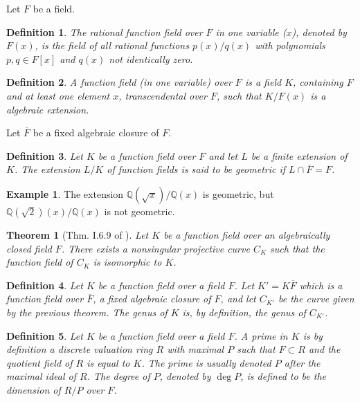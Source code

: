 \documentclass[12pt]{article}
\newtheorem{thm}{Theorem}
\newtheorem{defn}{Definition}
\theoremstyle{definition}
\newtheorem{exa}{Example}
\newcommand{\Rats}{\mathbb{Q}}
\begin{document}
Let $F$ be a field.

\begin{defn}
The rational function field over $F$ in one variable ($x$), denoted by $F(x)$, is the field of all rational functions $p(x)/q(x)$ with polynomials $p,q\in F[x]$ and $q(x)$ not identically zero.
\end{defn}

\begin{defn}
A function field (in one variable) over $F$ is a field $K$, containing $F$ and at least one element $x$, transcendental over $F$, such that $K/F(x)$ is a  algebraic extension.
\end{defn}

Let $\overline{F}$ be a fixed algebraic closure of $F$.

\begin{defn}
Let $K$ be a function field over $F$ and let $L$ be a finite extension of $K$. The extension $L/K$ of function fields is said to be geometric if $L\cap \overline{F}=F$.
\end{defn}

\begin{exa}
The extension $\Rats(\sqrt{x})/\Rats(x)$ is geometric, but $\Rats(\sqrt{2})(x)/\Rats(x)$ is not geometric.
\end{exa}

\begin{thm}[Thm. I.6.9 of \cite{hart}] Let $K$ be a function field over an algebraically closed field $F$. There exists a nonsingular projective curve $C_K$ such that the function field of $C_K$ is isomorphic to $K$.
\end{thm}

\begin{defn}
Let $K$ be a function field over a field $F$. Let $K'=K\overline{F}$ which is a function field over $\overline{F}$, a fixed algebraic closure of $F$, and let $C_{K'}$ be the curve given by the previous theorem. The genus of $K$ is, by definition, the genus of $C_{K'}$.
\end{defn}

\begin{defn}
Let $K$ be a function field over a field $F$. A prime in $K$ is by definition a discrete valuation ring $R$ with maximal $P$ such that $F\subset R$ and the quotient field of $R$ is equal to $K$. The prime is usually denoted $P$ after the maximal ideal of $R$. The degree of $P$, denoted by $\deg P$, is defined to be the dimension of $R/P$ over $F$.
\end{defn}
\end{document}
